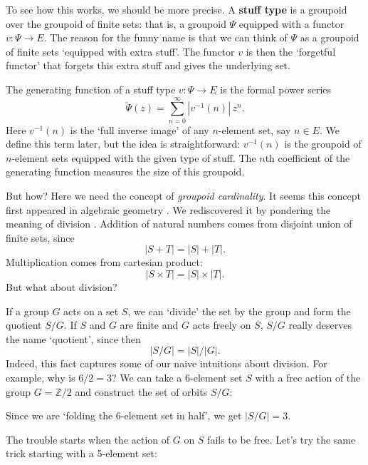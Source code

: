 \documentclass{article}
\renewcommand{\to}{\rightarrow}
\newcommand{\maps}{\colon}
\newcommand{\Z}{{\mathbb Z}}
\begin{document}
To see how this works, we should be more precise.  A {\bf stuff type}
is a groupoid over the groupoid of finite sets: that is, a groupoid
$\Psi$ equipped with a functor $v \maps \Psi \to E$.  The reason for
the funny name is that we can think of $\Psi$ as a groupoid of finite
sets `equipped with extra stuff'.  The functor $v$ is then the
`forgetful functor' that forgets this extra stuff and gives the
underlying set.

The generating function of a stuff type $v \maps \Psi \to E$ is the
formal power series
\begin{equation}
\label{eq:generating_function}
       \utilde{\Psi}(z) = \sum_{n = 0}^\infty |v^{-1}(n)| \, z^n .
\end{equation}
Here $v^{-1}(n)$ is the `full inverse image' of any $n$-element
set, say $n \in E$.  We define this term later, but the idea is
straightforward: $v^{-1}(n)$ is the groupoid of $n$-element sets
equipped with the given type of stuff.  The $n$th coefficient of the
generating function measures the size of this groupoid.  

But how?  Here we need the concept of {\it groupoid cardinality}.
It seems this concept first appeared in algebraic geometry
\cite{Behrends:1993, Kim:1995}.  We rediscovered it by
pondering the meaning of division \cite{BaezDolan:2001}.  Addition of
natural numbers comes from disjoint union of finite sets, since
\[        |S + T| = |S| + |T|  .\]
Multiplication comes from cartesian product:
\[        |S \times T| = |S| \times |T|  .\]
But what about division?

If a group $G$ acts on a set $S$, we can `divide' the set by the group
and form the quotient $S/G$.  If $S$ and $G$ are finite and $G$ acts
freely on $S$, $S/G$ really deserves the name `quotient', since then
\[          |S/G| = |S|/|G|.   \]
Indeed, this fact captures some of our naive intuitions about division.
For example, why is $6/2 = 3$?  We can take a 6-element
set $S$ with a free action of the group $G = \Z/2$ and 
construct the set of orbits $S/G$:

\medskip
\centerline{\epsfysize=1.0in}%
\medskip


\noindent
Since we are `folding the 6-element set in half', we get $|S/G| = 3$.

The trouble starts when the action of $G$ on $S$ fails to
be free.  Let's try the same trick starting with a 5-element set:

\medskip
\centerline{\epsfysize=1.0in}
\medskip
\end{document}
